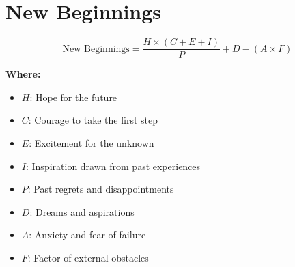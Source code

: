 \chapter{New Beginnings}

\begin{equation}
\text{New Beginnings} = \frac{H \times (C + E + I)}{P} + D - (A \times F)
\end{equation}

\textbf{Where:}

\begin{itemize}
    \item $H$: Hope for the future
    \item $C$: Courage to take the first step
    \item $E$: Excitement for the unknown
    \item $I$: Inspiration drawn from past experiences
    \item $P$: Past regrets and disappointments
    \item $D$: Dreams and aspirations
    \item $A$: Anxiety and fear of failure
    \item $F$: Factor of external obstacles
\end{itemize}